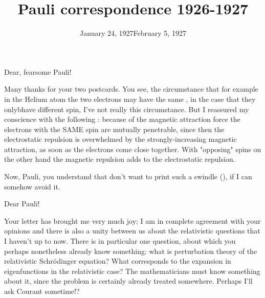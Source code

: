 \documentclass{article}
\title{Pauli correspondence 1926-1927}
\begin{document}
\date{January 24, 1927}
Dear, fearsome Pauli!

Many thanks for your two postcards. You see, the circumstance
that for example in the Helium atom the two electrons may have the same , in the case that they onlybhave different spin, I've not really  this circumstance. But I reassured my conscience with the following : because of the magnetic attraction force the electrons with the SAME spin are mutually penetrable, since then the electrostatic repulsion is overwhelmed by the strongly-increasing magnetic attraction, as soon as the electrons come close together. With "opposing" spins on the other hand the magnetic repulsion adds to the electrostatic repulsion.

Now, Pauli, you understand that don't want to print such a swindle (), if I can somehow avoid it. 


\date{February 5, 1927}

Dear Pauli!

Your letter has brought me very much joy; I am in complete agreement with your opinions and there is also a unity between us about the relativistic questions that I haven't  up to now. There is in particular one question, about which you perhaps nonetheless already know something: what is perturbation theory of the relativistic Schr\"odinger equation? What corresponds to the expansion in eigenfunctions in the relativistic case? The mathematicians must know something about it, since the problem is certainly already treated somewhere. Perhaps I'll ask Courant sometime!?
\end{document}
